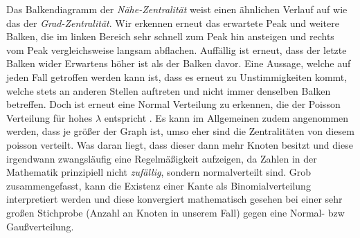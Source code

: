 Das Balkendiagramm der \textit{Nähe-Zentralität} weist einen ähnlichen Verlauf auf wie das der \textit{Grad-Zentralität}. Wir erkennen erneut das erwartete Peak und weitere Balken, die im linken Bereich sehr schnell zum Peak hin ansteigen und rechts vom Peak vergleichsweise langsam abflachen. Auffällig ist erneut, dass der letzte Balken wider Erwartens höher ist als der Balken davor. Eine Aussage, welche auf jeden Fall getroffen werden kann ist, dass es erneut zu Unstimmigkeiten kommt, welche stets an anderen Stellen auftreten und nicht immer denselben Balken betreffen. Doch ist erneut eine Normal Verteilung zu erkennen, die der Poisson Verteilung für hohes $\lambda$ entspricht \cite{Poisson}. Es kann im Allgemeinen zudem angenommen werden, dass je größer der Graph ist, umso eher sind die Zentralitäten von diesem poisson verteilt. Was daran liegt, dass dieser dann mehr Knoten besitzt und diese irgendwann zwangsläufig eine Regelmäßigkeit aufzeigen, da Zahlen in der Mathematik prinzipiell nicht \textit{zufällig}, sondern normalverteilt sind. Grob zusammengefasst, kann die Existenz einer Kante als Binomialverteilung interpretiert werden und diese konvergiert mathematisch gesehen bei einer sehr großen Stichprobe (Anzahl an Knoten in unserem Fall) gegen eine Normal- bzw Gaußverteilung. \\

